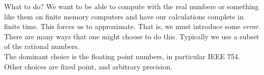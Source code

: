 \documentclass{beamer}
\begin{document}




\begin{frame}{What to do?}
We want to be able to compute with the real numbers or something like them on finite memory computers and 
have our calculations complete in finite time. This forces us to approximate. That is, we must introduce
some \emph{error}. \\
There are many ways that one might choose to do this. Typically we use a subset of
the rational numbers. \\
The dominant choice is the floating point numbers, in particular IEEE 754. \\
Other choices are fixed point, and arbitrary precision.
\end{frame}
\end{document}
